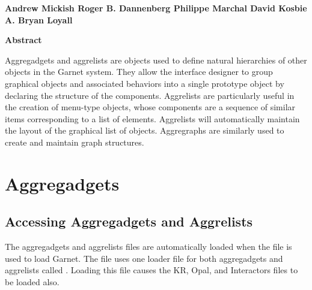 
\begin{titlepage}
\begin{titlebox}
\vspace{0.6 inch}

{\bf Andrew Mickish
Roger B. Dannenberg
Philippe Marchal
David Kosbie
A. Bryan Loyall}
\vspace{0.3 line}
\value{date}
\end{titlebox}
\begin{center}
{\bf Abstract}\end{center}
\begin{text}
Aggregadgets and aggrelists are objects used to define natural hierarchies
of other objects in the Garnet system.  They allow the interface designer to
group graphical objects and associated behaviors into a single prototype
object by declaring the structure of the components.
Aggrelists are particularly useful in the creation of menu-type objects,
whose components are a sequence of similar items corresponding to a list
of elements.  Aggrelists will automatically maintain the layout of the
graphical list of objects.  Aggregraphs are similarly used to create and
maintain graph structures.

\vspace{0.5 inch}

\end{text}
\end{titlepage}




\chapter{Aggregadgets}

\section{Accessing Aggregadgets and Aggrelists}
The aggregadgets and aggrelists files are automatically loaded when the
file  is used to load Garnet.  The
 file uses one loader file for both aggregadgets
and aggrelists called .  Loading this file
causes the KR, Opal, and Interactors files to be loaded also.

